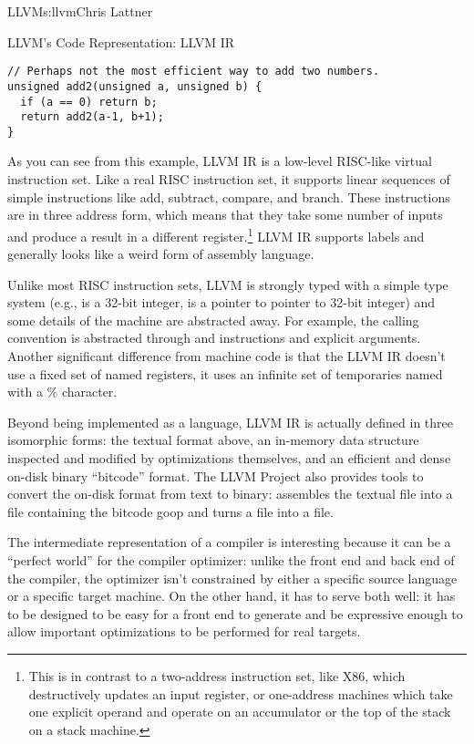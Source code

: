 \begin{aosachapter}{LLVM}{s:llvm}{Chris Lattner}
\begin{aosasect1}{LLVM's Code Representation: LLVM IR}
\begin{verbatim}
// Perhaps not the most efficient way to add two numbers.
unsigned add2(unsigned a, unsigned b) {
  if (a == 0) return b;
  return add2(a-1, b+1);
}
\end{verbatim}

\noindent As you can see from this example, LLVM IR is a low-level RISC-like
virtual instruction set.  Like a real RISC instruction set, it
supports linear sequences of simple instructions like add, subtract,
compare, and branch.  These instructions are in three address form,
which means that they take some number of inputs and produce a result
in a different register.\footnote{This is in contrast to a two-address
instruction set, like X86, which destructively updates an input
register, or one-address machines which take one explicit operand
and operate on an accumulator or the top of the stack on a stack
machine.} LLVM IR supports labels and generally looks like a weird
form of assembly language.

Unlike most RISC instruction sets, LLVM is strongly typed with a
simple type system (e.g.,  is a 32-bit integer, 
is a pointer to pointer to 32-bit integer) and some details of the
machine are abstracted away.  For example, the calling convention is
abstracted through  and  instructions and
explicit arguments.  Another significant difference from machine code
is that the LLVM IR doesn't use a fixed set of named registers, it
uses an infinite set of temporaries named with a \% character.

Beyond being implemented as a language, LLVM IR is actually defined in
three isomorphic forms: the textual format above, an in-memory data
structure inspected and modified by optimizations themselves, and an
efficient and dense on-disk binary ``bitcode'' format.  The LLVM
Project also provides tools to convert the on-disk format from text to
binary:  assembles the textual  file into a
 file containing the bitcode goop and  turns a
 file into a  file.

The intermediate representation of a compiler is interesting because
it can be a ``perfect world'' for the compiler optimizer: unlike the
front end and back end of the compiler, the optimizer isn't constrained
by either a specific source language or a specific target machine.  On
the other hand, it has to serve both well: it has to be designed to be
easy for a front end to generate and be expressive enough to allow
important optimizations to be performed for real targets.


\end{aosasect1}
\end{aosachapter}
